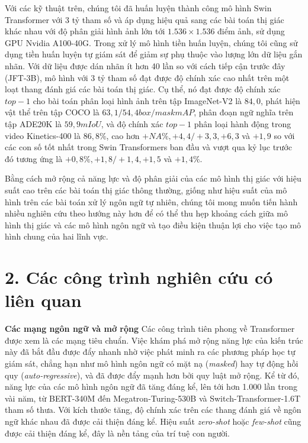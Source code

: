 \documentclass[times, twocolumn]{zHenriquesLab-StyleBioRxiv}
\begin{document}
Với các kỹ thuật trên, chúng tôi đã huấn luyện thành công mô hình Swin Transformer với 3 tỷ tham số và áp dụng hiệu quả sang các bài toán thị giác khác nhau với độ phân giải hình ảnh lớn tới $1.536 \times 1.536$ điểm ảnh, sử dụng GPU Nvidia A100-40G. Trong xử lý mô hình tiền huấn luyện, chúng tôi cũng sử dụng tiền huấn luyện tự giám sát để giảm sự phụ thuộc vào lượng lớn dữ liệu gắn nhãn. Với dữ liệu được dán nhãn ít hơn 40 lần so với cách tiếp cận trước đây (JFT-3B), mô hình với 3 tỷ tham số đạt được độ chính xác cao nhất trên một loạt thang đánh giá các bài toán thị giác. Cụ thể, nó đạt được độ chính xác $top-1$ cho bài toán phân loại hình ảnh trên tập ImageNet-V2 là $84,0$, phát hiện vật thể trên tập COCO là $63,1/54,4 box/mask mAP$, phân đoạn ngữ nghĩa trên tập ADE20K là $59,9 mIoU$, và độ chính xác $top-1$ phân loại hành động trong video Kinetics-400 là $86,8\%$, cao hơn $+ NA\%, + 4,4 / + 3,3, +6,3$ và $+1,9$ so với các con số tốt nhất trong Swin Transformers ban đầu và vượt qua kỷ lục trước đó tương ứng là $+ 0,8\%, + 1,8 / + 1,4, +1,5$ và $+ 1,4\%$.

Bằng cách mở rộng cả năng lực và độ phân giải của các mô hình thị giác với hiệu suất cao trên các bài toán thị giác thông thường, giống như hiệu suất của mô hình trên các bài toán xử lý ngôn ngữ tự nhiên, chúng tôi mong muốn tiến hành nhiều nghiên cứu theo hướng này hơn để có thể thu hẹp khoảng cách giữa mô hình thị giác và các mô hình ngôn ngữ và tạo điều kiện thuận lợi cho việc tạo mô hình chung của hai lĩnh vực.

\section*{2. Các công trình nghiên cứu có liên quan}

\textbf{Các mạng ngôn ngữ và mở rộng} Các công trình tiên phong về Transformer được xem là các mạng tiêu chuẩn. Việc khám phá mở rộng năng lực của kiến trúc này đã bắt đầu được đẩy nhanh nhờ việc phát minh ra các phương pháp học tự giám sát, chẳng hạn như mô hình ngôn ngữ có mặt nạ (\textit{masked}) hay tự động hồi quy (\textit{auto-regressive}), và đã được đẩy mạnh hơn bởi quy luật mở rộng. Kể từ đó, năng lực của các mô hình ngôn ngữ đã tăng đáng kể, lên tới hơn 1.000 lần trong vài năm, từ BERT-340M đến Megatron-Turing-530B và Switch-Transformer-1.6T tham số thưa. Với kích thước tăng, độ chính xác trên các thang đánh giá về ngôn ngữ khác nhau đã được cải thiện đáng kể. Hiệu suất \textit{zero-shot} hoặc \textit{few-shot} cũng được cải thiện đáng kể, đây là nền tảng của trí tuệ con người.
\end{document}
